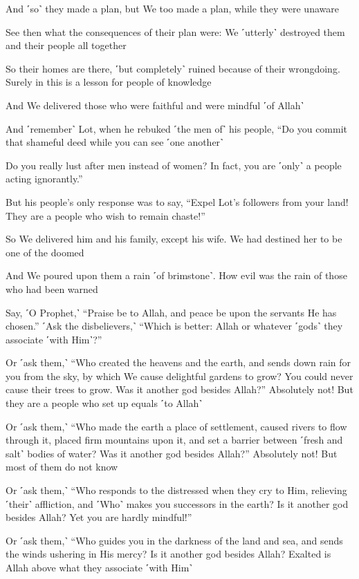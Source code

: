 And ˹so˺ they made a plan, but We too made a plan, while they were unaware

See then what the consequences of their plan were: We ˹utterly˺ destroyed them and their people all together

So their homes are there, ˹but completely˺ ruined because of their wrongdoing. Surely in this is a lesson for people of knowledge

And We delivered those who were faithful and were mindful ˹of Allah˺

And ˹remember˺ Lot, when he rebuked ˹the men of˺ his people, “Do you commit that shameful deed while you can see ˹one another˺

Do you really lust after men instead of women? In fact, you are ˹only˺ a people acting ignorantly.”

But his people’s only response was to say, “Expel Lot’s followers from your land! They are a people who wish to remain chaste!”

So We delivered him and his family, except his wife. We had destined her to be one of the doomed

And We poured upon them a rain ˹of brimstone˺. How evil was the rain of those who had been warned

Say, ˹O Prophet,˺ “Praise be to Allah, and peace be upon the servants He has chosen.” ˹Ask the disbelievers,˺ “Which is better: Allah or whatever ˹gods˺ they associate ˹with Him˺?”

Or ˹ask them,˺ “Who created the heavens and the earth, and sends down rain for you from the sky, by which We cause delightful gardens to grow? You could never cause their trees to grow. Was it another god besides Allah?” Absolutely not! But they are a people who set up equals ˹to Allah˺

Or ˹ask them,˺ “Who made the earth a place of settlement, caused rivers to flow through it, placed firm mountains upon it, and set a barrier between ˹fresh and salt˺ bodies of water? Was it another god besides Allah?” Absolutely not! But most of them do not know

Or ˹ask them,˺ “Who responds to the distressed when they cry to Him, relieving ˹their˺ affliction, and ˹Who˺ makes you successors in the earth? Is it another god besides Allah? Yet you are hardly mindful!”

Or ˹ask them,˺ “Who guides you in the darkness of the land and sea, and sends the winds ushering in His mercy? Is it another god besides Allah? Exalted is Allah above what they associate ˹with Him˺

